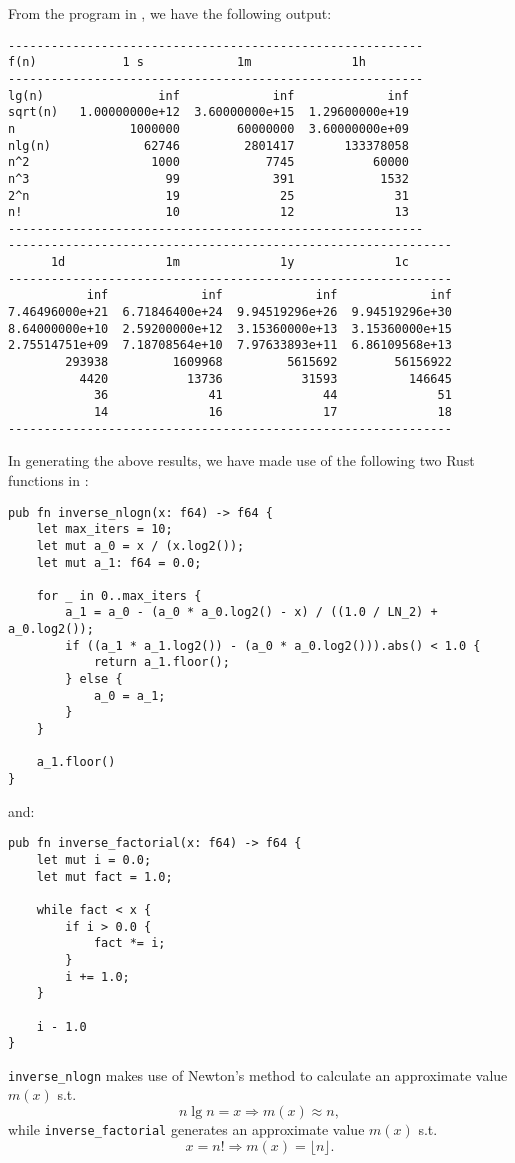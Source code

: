 
From the program in , we have the following
output:
\small\begin{verbatim}
----------------------------------------------------------
f(n)            1 s             1m              1h        
----------------------------------------------------------
lg(n)                inf             inf             inf  
sqrt(n)   1.00000000e+12  3.60000000e+15  1.29600000e+19  
n                1000000        60000000  3.60000000e+09  
nlg(n)             62746         2801417       133378058  
n^2                 1000            7745           60000  
n^3                   99             391            1532  
2^n                   19              25              31  
n!                    10              12              13  
----------------------------------------------------------
--------------------------------------------------------------
      1d              1m              1y              1c
--------------------------------------------------------------
           inf             inf             inf             inf
7.46496000e+21  6.71846400e+24  9.94519296e+26  9.94519296e+30
8.64000000e+10  2.59200000e+12  3.15360000e+13  3.15360000e+15
2.75514751e+09  7.18708564e+10  7.97633893e+11  6.86109568e+13
        293938         1609968         5615692        56156922
          4420           13736           31593          146645
            36              41              44              51
            14              16              17              18
--------------------------------------------------------------
\end{verbatim}\normalsize
\qquad In generating the above results, we have made use of the following two Rust 
functions in :
\small\begin{verbatim}
pub fn inverse_nlogn(x: f64) -> f64 {
    let max_iters = 10;
    let mut a_0 = x / (x.log2());
    let mut a_1: f64 = 0.0;

    for _ in 0..max_iters {
        a_1 = a_0 - (a_0 * a_0.log2() - x) / ((1.0 / LN_2) + a_0.log2());
        if ((a_1 * a_1.log2()) - (a_0 * a_0.log2())).abs() < 1.0 {
            return a_1.floor();
        } else {
            a_0 = a_1;
        }
    }

    a_1.floor()
}
\end{verbatim}\normalsize
and:
\small\begin{verbatim}
pub fn inverse_factorial(x: f64) -> f64 {
    let mut i = 0.0;
    let mut fact = 1.0;

    while fact < x {
        if i > 0.0 {
            fact *= i;
        }
        i += 1.0;
    }

    i - 1.0
}
\end{verbatim}\normalsize
\texttt{inverse\_nlogn} makes use of Newton's method to calculate an approximate 
value $m(x)$ s.t. 
\[
    n\lg{n} = x \Rightarrow m(x) \approx n, 
\]
while \texttt{inverse\_factorial} generates an approximate value $m(x)$ s.t. 
\[
    x = n! \Rightarrow m(x) = \lfloor n \rfloor. 
\]
